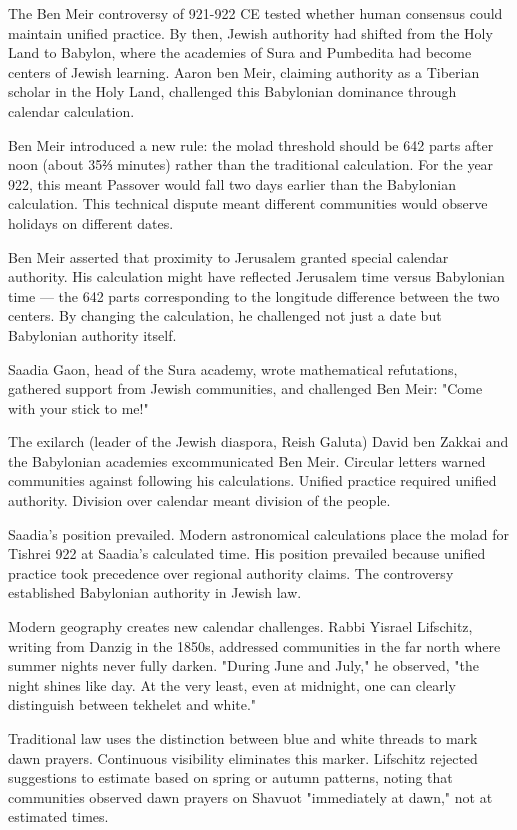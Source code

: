 The Ben Meir controversy of 921-922 CE tested whether human consensus could maintain unified practice. By then, Jewish authority had shifted from the Holy Land to Babylon, where the academies of Sura and Pumbedita had become centers of Jewish learning. Aaron ben Meir, claiming authority as a Tiberian scholar in the Holy Land, challenged this Babylonian dominance through calendar calculation.

Ben Meir introduced a new rule: the molad threshold should be 642 parts after noon (about 35⅔ minutes) rather than the traditional calculation. For the year 922, this meant Passover would fall two days earlier than the Babylonian calculation. This technical dispute meant different communities would observe holidays on different dates.

Ben Meir asserted that proximity to Jerusalem granted special calendar authority. His calculation might have reflected Jerusalem time versus Babylonian time — the 642 parts corresponding to the longitude difference between the two centers. By changing the calculation, he challenged not just a date but Babylonian authority itself.

Saadia Gaon, head of the Sura academy, wrote mathematical refutations, gathered support from Jewish communities, and challenged Ben Meir: "Come with your stick to me!"

The exilarch (leader of the Jewish diaspora, Reish Galuta) David ben Zakkai and the Babylonian academies excommunicated Ben Meir. Circular letters warned communities against following his calculations. Unified practice required unified authority. Division over calendar meant division of the people.

Saadia's position prevailed. Modern astronomical calculations place the molad for Tishrei 922 at Saadia's calculated time. His position prevailed because unified practice took precedence over regional authority claims. The controversy established Babylonian authority in Jewish law.

Modern geography creates new calendar challenges. Rabbi Yisrael Lifschitz, writing from Danzig in the 1850s, addressed communities in the far north where summer nights never fully darken. "During June and July," he observed, "the night shines like day. At the very least, even at midnight, one can clearly distinguish between tekhelet and white." 

Traditional law uses the distinction between blue and white threads to mark dawn prayers. Continuous visibility eliminates this marker. Lifschitz rejected suggestions to estimate based on spring or autumn patterns, noting that communities observed dawn prayers on Shavuot "immediately at dawn," not at estimated times.

